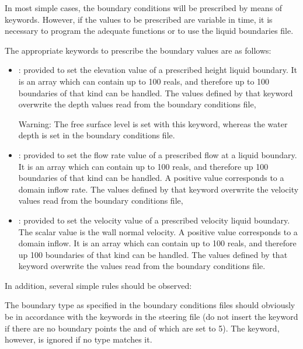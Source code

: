 In most simple cases, the boundary conditions will be prescribed by means of
keywords. However, if the values to be prescribed are variable in time, it is
necessary to program the adequate functions or to use the liquid boundaries
file.

The appropriate keywords to prescribe the boundary values are as follows:

\begin{itemize}
\item {}: provided to set the
elevation value of a prescribed height liquid boundary. It is an array which
can contain up to 100 reals, and therefore up to 100 boundaries of that kind
can be handled. The values defined by that keyword overwrite the depth values
read from the boundary conditions file,

\begin{WarningBlock}{Warning:}
The free surface level is set with this keyword, whereas the water depth is set
in the boundary conditions file.
\end{WarningBlock}

\item {}: provided to set the flow rate value of a
prescribed flow at a liquid boundary. It is an array which can contain up to
100 reals, and therefore up 100 boundaries of that kind can be handled. A
positive value corresponds to a domain inflow rate. The values defined by that
keyword overwrite the velocity values read from the boundary conditions file,

\item {}: provided to set the velocity value of a
prescribed velocity liquid boundary. The scalar value is the wall normal
velocity. A positive value corresponds to a domain inflow. It is an array which
can contain up to 100 reals, and therefore up 100 boundaries of that kind can
be handled. The values defined by that keyword overwrite the values read from
the boundary conditions file.
\end{itemize}

In addition, several simple rules should be observed:

The boundary type as specified in the boundary conditions files should
obviously be in accordance with the keywords in the steering file (do not
insert the keyword  if there are no boundary
points the  and  of which are set to
5). The keyword, however, is ignored if no type matches it.


